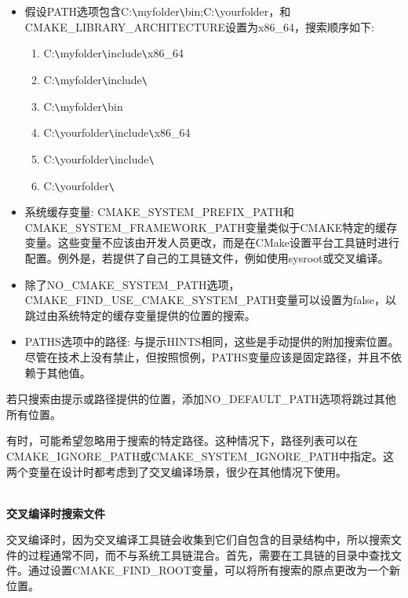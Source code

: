 \begin{itemize}
\item 
假设PATH选项包含C:\verb|\|myfolder\verb|\|bin;C:\verb|\|yourfolder，和CMAKE\_LIBRARY\_ARCHITECTURE设置为x86\_64，搜索顺序如下:

\begin{enumerate}
\item 
C:\verb|\|myfolder\verb|\|include\verb|\|x86\_64

\item 
C:\verb|\|myfolder\verb|\|include\verb|\|

\item 
C:\verb|\|myfolder\verb|\|bin

\item 
C:\verb|\|yourfolder\verb|\|include\verb|\|x86\_64

\item 
C:\verb|\|yourfolder\verb|\|include\verb|\|

\item 
C:\verb|\|yourfolder\verb|\|
\end{enumerate}

\item 
系统缓存变量: CMAKE\_SYSTEM\_PREFIX\_PATH和CMAKE\_SYSTEM\_FRAMEWORK\_PATH变量类似于CMAKE特定的缓存变量。这些变量不应该由开发人员更改，而是在CMake设置平台工具链时进行配置。例外是，若提供了自己的工具链文件，例如使用sysroot或交叉编译。

\item 
除了NO\_CMAKE\_SYSTEM\_PATH选项，CMAKE\_FIND\_USE\_CMAKE\_SYSTEM\_PATH变量可以设置为false，以跳过由系统特定的缓存变量提供的位置的搜索。

\item 
PATHS选项中的路径: 与提示HINTS相同，这些是手动提供的附加搜索位置。尽管在技术上没有禁止，但按照惯例，PATHS变量应该是固定路径，并且不依赖于其他值。
\end{itemize}

若只搜索由提示或路径提供的位置，添加NO\_DEFAULT\_PATH选项将跳过其他所有位置。

有时，可能希望忽略用于搜索的特定路径。这种情况下，路径列表可以在CMAKE\_IGNORE\_PATH或CMAKE\_SYSTEM\_IGNORE\_PATH中指定。这两个变量在设计时都考虑到了交叉编译场景，很少在其他情况下使用。

\hspace*{\fill} \\ %
\noindent
\textbf{交叉编译时搜索文件}

交叉编译时，因为交叉编译工具链会收集到它们自包含的目录结构中，所以搜索文件的过程通常不同，而不与系统工具链混合。首先，需要在工具链的目录中查找文件。通过设置CMAKE\_FIND\_ROOT变量，可以将所有搜索的原点更改为一个新位置。

